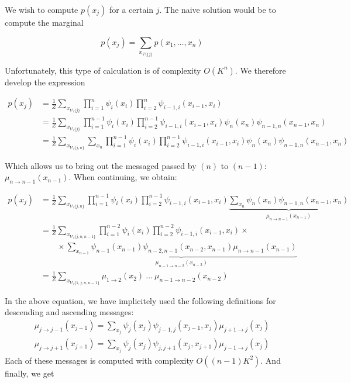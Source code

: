 \documentclass[12pt,a4paper]{report}
\newcommand{\forscribe}[2]{#2}  %
\begin{document}
We wish to compute \( p(x_j)\) for a certain \(j\). The naive solution would be to compute the marginal  

\begin{equation}
	p(x_j) = \sum_{x_{V \setminus \{j\}}} p(x_1, \dots , x_n)
\end{equation}

Unfortunately, this type of calculation is of complexity \(O(K^n)\). We therefore develop the expression

\begin{align}
	p(x_j) 	&= \frac{1}{Z} \sum_{x_{V \setminus \{j\}}} \prod_{i=1}^{n} \psi_i (x_i) \prod_{i=2}^{n} \psi_{i-1,i} (x_{i-1},x_i) \\
			&= \frac{1}{Z} \sum_{x_{V \setminus \{j\}}} \prod_{i=1}^{n-1} \psi_i (x_i) \prod_{i=2}^{n-1} \psi_{i-1,i} (x_{i-1},x_i) \psi_n (x_n) \psi_{n-1,n} (x_{n-1},x_n) \\
			&= \frac{1}{Z} \sum_{x_{V \setminus \{j,n\}}} \sum_{x_n} \prod_{i=1}^{n-1} \psi_i (x_i) \prod_{i=2}^{n-1} \psi_{i-1,i} (x_{i-1},x_i) \psi_n (x_n) \psi_{n-1,n} (x_{n-1},x_n) 
\end{align}

Which allows us to bring out the messaged passed by \((n)\) to \((n-1)\): \( \mu_{n\rightarrow n-1}(x_{n-1}) \). When continuing, we obtain:

\begin{align}			
	p(x_j)	&= \frac{1}{Z} \sum_{x_{V \setminus \{j,n\}}} \prod_{i=1}^{n-1} \psi_i (x_i) \prod_{i=2}^{n-1} \psi_{i-1,i} (x_{i-1},x_i) 
					\underbrace{\sum_{x_n} \psi_n (x_n) \psi_{n-1,n} (x_{n-1},x_n)}_{\mu_{n\rightarrow n-1}(x_{n-1})} \\
			&= \frac{1}{Z} \sum_{x_{V \setminus \{j,n,n-1\}}} \prod_{i=1}^{n-2} \psi_i (x_i) \prod_{i=2}^{n-2} \psi_{i-1,i} (x_{i-1},x_i) \times \nonumber \\
			& \qquad {} \times \underbrace{\sum_{x_{n-1}} \psi_{n-1} (x_{n-1}) \psi_{n-2,n-1} (x_{n-2},x_{n-1}) \mu_{n\rightarrow n-1}(x_{n-1})}_{\mu_{n-1 \rightarrow n-2} (x_{n-2})}\\
			&= \frac{1}{Z} \sum_{x_{V \setminus \{1,j,n,n-1\}}} \mu_{1 \rightarrow 2} (\forscribe{x_{n-2}}{x_2}) \ \dots \ \mu_{n-1 \rightarrow n-2} (x_{n-2}) 
\end{align}
\forscribe{}{
In the above equation, we have implicitely used the following definitions for descending and ascending messages:
\begin{align}
\mu_{j \rightarrow j-1}(x_{j-1}) = \sum_{x_j}\psi_{j}(x_j) \psi_{j-1,j}(x_{j-1},x_j)\mu_{j+1 \rightarrow j}(x_j) \\
\mu_{j \rightarrow j+1}(x_{j+1}) = \sum_{x_j}\psi_{j}(x_j) \psi_{j,j+1}(x_{j},x_{j+1})\mu_{j-1 \rightarrow j}(x_j) 
\end{align}
Each of these messages is computed with complexity $O((n-1)K^2)$.}
And finally, we get 
\end{document}
